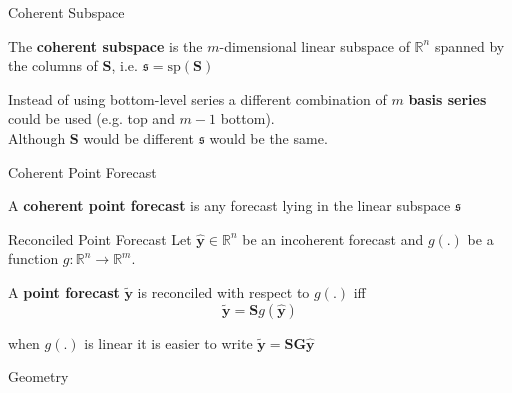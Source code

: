 \documentclass{beamer}
\begin{document}
  \begin{frame}{Coherent Subspace}
    \begin{definition} 
	  The {\bf coherent subspace} is the $m$-dimensional linear subspace of $\mathbb{R}^n$ spanned by the columns of ${\bm S}$, i.e. $\mathfrak{s}=\mbox{sp}({\bm S})$
    \end{definition}
    Instead of using bottom-level series a different combination of $m$ {\bf basis series} could be used (e.g. top and $m-1$ bottom).\\
    Although ${\bm S}$ would be different $\mathfrak{s}$ would be the same.
  \end{frame}
  \begin{frame}{Coherent Point Forecast}
  \begin{definition} 
  	A {\bf coherent point forecast} is any forecast lying in the linear subspace $\mathfrak{s}$
  \end{definition}
  \end{frame}
  \begin{frame}{Reconciled Point Forecast}
  Let $\hat{\bm y}\in\mathbb{R}^n$ be an incoherent forecast and $g(.)$ be a function $g:\mathbb{R}^n\rightarrow\mathbb{R}^m$.
  \begin{definition} 
	A {\bf point forecast} $\tilde{\bm y}$ is reconciled with respect to $g(.)$ iff 
	\begin{equation*}
    \tilde{\bm y}={\bm S}g(\hat{\bm y})
	\end{equation*}
  \end{definition}
  when $g(.)$ is linear it is easier to write $\tilde{\bm y}={\bm S}{\bm G}\hat{\bm y}$
  \end{frame}
  \begin{frame}{Geometry}
  \vspace{-2.3cm}
  \centering 
  
  \end{frame}
\end{document}
